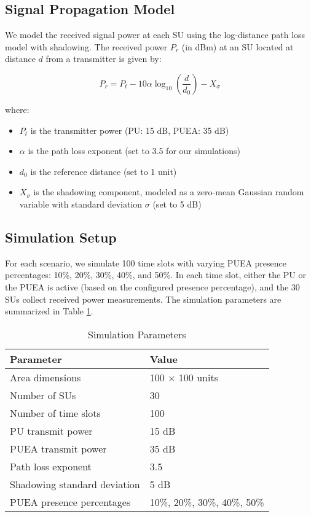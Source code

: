 \documentclass[conference]{IEEEtran}
\begin{document}
\subsection{Signal Propagation Model}

We model the received signal power at each SU using the log-distance path loss model with shadowing. The received power $P_r$ (in dBm) at an SU located at distance $d$ from a transmitter is given by:

\begin{equation}
P_r = P_t - 10\alpha\log_{10}\left(\frac{d}{d_0}\right) - X_\sigma
\end{equation}

where:
\begin{itemize}
    \item $P_t$ is the transmitter power (PU: 15 dB, PUEA: 35 dB)
    \item $\alpha$ is the path loss exponent (set to 3.5 for our simulations)
    \item $d_0$ is the reference distance (set to 1 unit)
    \item $X_\sigma$ is the shadowing component, modeled as a zero-mean Gaussian random variable with standard deviation $\sigma$ (set to 5 dB)
\end{itemize}

\subsection{Simulation Setup}

For each scenario, we simulate 100 time slots with varying PUEA presence percentages: 10\%, 20\%, 30\%, 40\%, and 50\%. In each time slot, either the PU or the PUEA is active (based on the configured presence percentage), and the 30 SUs collect received power measurements. The simulation parameters are summarized in Table \ref{tab:simulation_parameters}.

\begin{table}[!t]
\caption{Simulation Parameters}
\label{tab:simulation_parameters}
\centering
\begin{tabular}{@{}ll@{}}
\toprule
\textbf{Parameter} & \textbf{Value} \\
\midrule
Area dimensions & 100 × 100 units \\
Number of SUs & 30 \\
Number of time slots & 100 \\
PU transmit power & 15 dB \\
PUEA transmit power & 35 dB \\
Path loss exponent & 3.5 \\
Shadowing standard deviation & 5 dB \\
PUEA presence percentages & 10\%, 20\%, 30\%, 40\%, 50\% \\
\bottomrule
\end{tabular}
\end{table}
\end{document}
